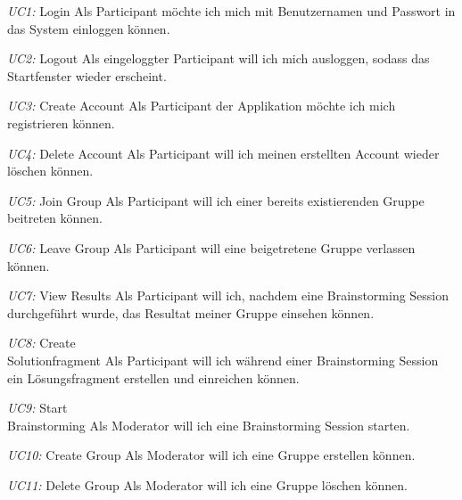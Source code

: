 \begin{basedescript}{
		\desclabelstyle{\multilinelabel}
		\desclabelwidth{4.5cm}}
	\item[\textit{UC1: }Login] Als Participant möchte ich mich mit Benutzernamen und Passwort in das System einloggen können.
	
	\item[\textit{UC2: }Logout] Als eingeloggter Participant will ich mich ausloggen, sodass das Startfenster wieder erscheint.
	
	\item[\textit{UC3: }Create Account] Als Participant der Applikation möchte ich mich registrieren können.
	
	\item[\textit{UC4: }Delete Account] Als Participant will ich meinen erstellten Account wieder löschen können.
	
	\item[\textit{UC5: }Join Group] Als Participant will ich einer bereits existierenden Gruppe beitreten können.
	
	\item[\textit{UC6: }Leave Group] Als Participant will eine beigetretene Gruppe verlassen können.
	
	\item[\textit{UC7: }View Results] Als Participant will ich, nachdem eine Brainstorming Session durchgeführt wurde, das Resultat meiner Gruppe einsehen können.
	
	\item[\textit{UC8: }Create\\Solutionfragment] Als Participant will ich während einer Brainstorming Session ein Lösungsfragment erstellen und einreichen können. 
	
	\item[\textit{UC9: }Start \\Brainstorming] Als Moderator will ich eine Brainstorming Session starten.
	
	\item[\textit{UC10: }Create Group] Als Moderator will ich 
	eine Gruppe erstellen können. 
	
	\item[\textit{UC11: }Delete Group] Als Moderator will ich eine Gruppe löschen können.
\end{basedescript}

